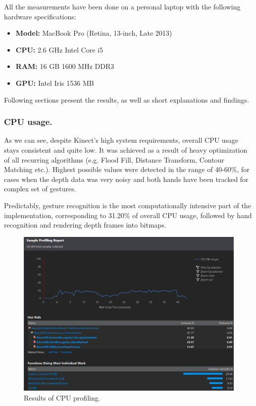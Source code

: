 \documentclass[a4paper,11pt,oneside]{article}
\begin{document}
All the measurements have been done on a personal laptop with the following hardware specifications:
\begin{itemize}
\item \textbf{Model:} MacBook Pro (Retina, 13-inch, Late 2013)
\item \textbf{CPU:} 2.6 GHz Intel Core i5
\item \textbf{RAM:} 16 GB 1600 MHz DDR3
\item \textbf{GPU:} Intel Iris 1536 MB
\end{itemize}

Following sections present the results, as well as short explanations and findings.

\subsubsection{CPU usage.}

As we can see, despite Kinect's high system requirements, overall CPU usage stays consistent and quite low. It was achieved as a result of heavy optimization of all recurring algorithms (e.g. Flood Fill, Distance Transform, Contour Matching etc.). Highest possible values were detected in the range of 40-60\%, for cases when the depth data was very noisy and both hands have been tracked for complex set of gestures.

Predictably, gesture recognition is the most computationally intensive part of the implementation, corresponding to 31.20\% of overall CPU usage, followed by hand recognition and rendering depth frames into bitmaps.

\begin{figure}[H]
\centering
\includegraphics[scale=0.6]{cpu-profiling.png}
\caption{Results of CPU profiling.}
\end{figure}
\end{document}
